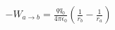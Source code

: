 \documentclass[preview]{standalone}
\begin{document}
\begin{align*}
- W_{a \rightarrow b} = \frac{q q_0}{4 \pi \epsilon_0} \left( \frac{1}{r_b} - \frac{1}{r_a} \right)
\end{align*}
\end{document}
